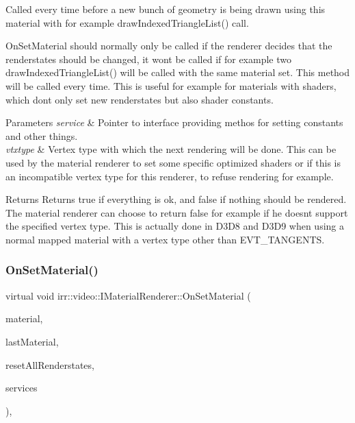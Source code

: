 Called every time before a new bunch of geometry is being drawn using this material with for example draw\+Indexed\+Triangle\+List() call. 

On\+Set\+Material should normally only be called if the renderer decides that the renderstates should be changed, it won\textquotesingle{}t be called if for example two draw\+Indexed\+Triangle\+List() will be called with the same material set. This method will be called every time. This is useful for example for materials with shaders, which don\textquotesingle{}t only set new renderstates but also shader constants. 
\begin{DoxyParams}{Parameters}
{\em service} & Pointer to interface providing methos for setting constants and other things. \\
\hline
{\em vtxtype} & Vertex type with which the next rendering will be done. This can be used by the material renderer to set some specific optimized shaders or if this is an incompatible vertex type for this renderer, to refuse rendering for example. \\
\hline
\end{DoxyParams}
\begin{DoxyReturn}{Returns}
Returns true if everything is ok, and false if nothing should be rendered. The material renderer can choose to return false for example if he doesn\textquotesingle{}t support the specified vertex type. This is actually done in D3\+D8 and D3\+D9 when using a normal mapped material with a vertex type other than E\+V\+T\+\_\+\+T\+A\+N\+G\+E\+N\+TS. 
\end{DoxyReturn}
\mbox{\label{classirr_1_1video_1_1IMaterialRenderer_aeaffc03c1b9feb40cd01469726b287e3}} 
\subsubsection{\texorpdfstring{On\+Set\+Material()}{OnSetMaterial()}}
{\footnotesize\ttfamily virtual void irr\+::video\+::\+I\+Material\+Renderer\+::\+On\+Set\+Material (\begin{DoxyParamCaption}\item[{const \hyperlink{classirr_1_1video_1_1SMaterial}{S\+Material} \&}]{material,  }\item[{const \hyperlink{classirr_1_1video_1_1SMaterial}{S\+Material} \&}]{last\+Material,  }\item[{bool}]{reset\+All\+Renderstates,  }\item[{\hyperlink{classirr_1_1video_1_1IMaterialRendererServices}{I\+Material\+Renderer\+Services} $\ast$}]{services }\end{DoxyParamCaption})\hspace{0.3cm}{\ttfamily [inline]}, {\ttfamily [virtual]}}



